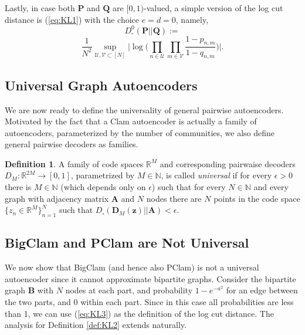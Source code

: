 \documentclass{article}
\theoremstyle{plain}
\theoremstyle{definition}
\newtheorem{definition}[theorem]{Definition}
\theoremstyle{remark}
\begin{document}
Lastly, in case both $\mathbf{P}$ and $\mathbf{Q}$ are $[0,1)$-valued, a simple version of the log cut distance is (\ref{eq:KL1}) with the choice $e=d=0$, namely,
 \[D^0_{\square}(\mathbf{P} || \mathbf{Q}):=\]
 \begin{equation}
    \label{eq:KL3}
         \frac{1}{N^2}\sup_{\mathcal{U},\mathcal{V}\subset[N]}\Big|\log\Big(\prod_{n\in \mathcal{U}}\prod_{m\in \mathcal{V}}
\frac{1-p_{n,m}}{1-q_{n,m}}\Big)\Big|.
    \end{equation}



\subsection{Universal Graph Autoencoders}

We are now ready to define the universality of general pairwise autoencoders. Motivated by the fact that a Clam autoencoder is actually a family of autoencoders, parameterized by the number of communities, we also define general pairwise decoders as families.

\begin{definition}
    A family of code spaces $\mathbb{R}^M$ and corresponding pairwaise decoders $D_M:\mathbb{R}^{2M}\rightarrow[0,1]$, parametrized by $M\in\mathbb{N}$, is called  \emph{universal} if for every $\epsilon>0$ there is $M\in\mathbb{N}$ (which depends only on $\epsilon$) such that for every $N\in\mathbb{N}$ and every graph  with adjacency matrix $\mathbf{A}$ and $N$ nodes there are $N$ points in the code space $\{z_n\in\mathbb{R}^M\}_{n=1}^N$ such that 
     $D_{\square}(\mathbf{D}_M(\mathbf{z}) || \mathbf{A}) <\epsilon$.  
\end{definition}

\subsection{BigClam and PClam are Not Universal}
\label{BigClam is Not Universal}

We now show that BigClam (and hence also PClam) is not a universal autoencoder since it cannot approximate bipartite graphs.
Consider the bipartite graph $\mathbf{B}$ with $N$ nodes at each part, and probability $1-e^{-a^2}$ for an edge between the two parts, and $0$ within each part. 
Since in this case all probabilities are less than 1, we can use (\ref{eq:KL3}) as the definition of the log cut distance. The analysis for Definition \ref{def:KL2} extends naturally.
\end{document}
